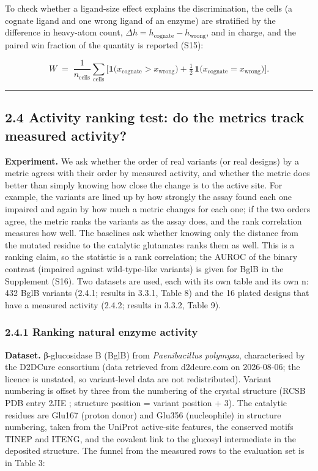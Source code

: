 \documentclass[
  10pt,
]{article}
\DeclareRobustCommand{\_}{\textunderscore\hspace{0pt}}
\begin{document}
To check whether a
ligand-size effect
explains the
discrimination, the
cells (a cognate
ligand and one wrong
ligand of an enzyme)
are stratified by
the difference in
heavy-atom count,
\(\Delta h = h_{\text{cognate}} - h_{\text{wrong}}\),
and in charge, and
the paired win
fraction of the
quantity is reported
(S15):

\begin{equation*}W \;=\; \frac{1}{n_{\mathrm{cells}}}\sum_{\mathrm{cells}}\Big[\mathbf{1}\big(x_{\mathrm{cognate}} > x_{\mathrm{wrong}}\big) + \tfrac12\,\mathbf{1}\big(x_{\mathrm{cognate}} = x_{\mathrm{wrong}}\big)\Big]. \tag{10}\end{equation*}

\begin{center}\rule{0.5\linewidth}{0.5pt}\end{center}

\subsection{2.4
Activity ranking
test: do the metrics
track measured
activity?}

\textbf{Experiment.}
We ask whether the
order of real
variants (or real
designs) by a metric
agrees with their
order by measured
activity, and
whether the metric
does better than
simply knowing how
close the change is
to the active site.
For example, the
variants are lined
up by how strongly
the assay found each
one impaired and
again by how much a
metric changes for
each one; if the two
orders agree, the
metric ranks the
variants as the
assay does, and the
rank correlation
measures how well.
The baselines ask
whether knowing only
the distance from
the mutated residue
to the catalytic
glutamates ranks
them as well. This
is a ranking claim,
so the statistic is
a rank correlation;
the AUROC of the
binary contrast
(impaired against
wild-type-like
variants) is given
for BglB in the
Supplement (S16).
Two datasets are
used, each with its
own table and its
own n: 432 BglB
variants (2.4.1;
results in 3.3.1,
Table 8) and the 16
plated designs that
have a measured
activity (2.4.2;
results in 3.3.2,
Table 9).

\subsubsection{2.4.1
Ranking natural
enzyme activity}

\textbf{Dataset.}
β-glucosidase B
(BglB) from
\emph{Paenibacillus
polymyxa},
characterised by the
D2DCure consortium
\cite{carlin2016}
(data retrieved from
d2dcure.com on
2026-08-06; the
licence is unstated,
so variant-level
data are not
redistributed).
Variant numbering is
offset by three from
the numbering of the
crystal structure
(RCSB PDB entry 2JIE
\cite{burley2025,berman2000};
structure position =
variant position +
3). The catalytic
residues are Glu167
(proton donor) and
Glu356 (nucleophile)
in structure
numbering, taken
from the UniProt
\cite{uniprot2023}
active-site
features, the
conserved motifs
TINEP and ITENG, and
the covalent link to
the glucosyl
intermediate in the
deposited structure.
The funnel from the
measured rows to the
evaluation set is in
Table 3:
\end{document}
